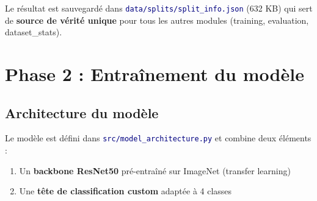 \documentclass[11pt,a4paper,oneside]{report}
\newcommand{\code}[1]{\texttt{\textcolor{navy}{#1}}}
\begin{document}
Le résultat est sauvegardé dans \code{data/splits/split\_info.json} (632 KB) qui sert de \textbf{source de vérité unique} pour tous les autres modules (training, evaluation, dataset\_stats).

\chapter{Phase 2 : Entraînement du modèle}

\section{Architecture du modèle}

Le modèle est défini dans \code{src/model\_architecture.py} et combine deux éléments :

\begin{enumerate}
\item Un \textbf{backbone ResNet50} pré-entraîné sur ImageNet (transfer learning)
\item Une \textbf{tête de classification custom} adaptée à 4 classes
\end{enumerate}
\end{document}
